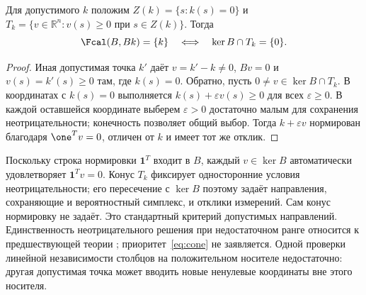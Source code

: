 \begin{theorem}
\label{thm:cone}
{Для допустимого $k$ положим $Z(k)=\{s:k(s)=0\}$ и $T_k=\{v\in\mathbb R^n:v(s)\geq0\text{ при }s\in Z(k)\}$. Тогда}
\begin{equation}\label{eq:cone}
 \Fcal(B,Bk)=\{k\}\quad\Longleftrightarrow\quad
 \ker B\cap T_k=\{0\}.
\end{equation}
\end{theorem}
\begin{proof}
{Иная допустимая точка $k'$ даёт $v=k'-k\ne0$, $Bv=0$ и $v(s)=k'(s)\geq0$ там, где $k(s)=0$. Обратно, пусть $0\ne v\in\ker B\cap T_k$. В координатах с $k(s)=0$ выполняется $k(s)+\varepsilon v(s)\geq0$ для всех $\varepsilon\geq0$. В каждой оставшейся координате выберем $\varepsilon>0$ достаточно малым для сохранения неотрицательности; конечность позволяет общий выбор. Тогда $k+\varepsilon v$ нормирован благодаря $\one^Tv=0$, отличен от $k$ и имеет тот же отклик.}
\end{proof}

{Поскольку строка нормировки $\mathbf{1}^T$ входит в $B$, каждый $v\in\ker B$ автоматически удовлетворяет $\mathbf{1}^Tv=0$. Конус $T_k$ фиксирует односторонние условия неотрицательности; его пересечение с $\ker B$ поэтому задаёт направления, сохраняющие и вероятностный симплекс, и отклики измерений. Сам конус нормировку не задаёт. Это стандартный критерий допустимых направлений. Единственность неотрицательного решения при недостаточном ранге относится к предшествующей теории \cite{DonohoTanner}; приоритет~\eqref{eq:cone} не заявляется. Одной проверки линейной независимости столбцов на положительном носителе недостаточно: другая допустимая точка может вводить новые ненулевые координаты вне этого носителя.}

